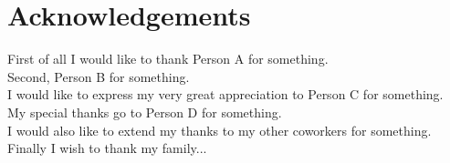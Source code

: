 
\bigskip

\begingroup
\let\clearpage\relax
\let\cleardoublepage\relax
\let\cleardoublepage\relax
\chapter*{Acknowledgements}

First of all I would like to thank Person A for something.\\

Second, Person B for something.\\

I would like to express my very great appreciation to Person C for something.\\

My special thanks go to Person D for something.\\

I would also like to extend my thanks to my other coworkers for something.\\

Finally I wish to thank my family...\\

\endgroup